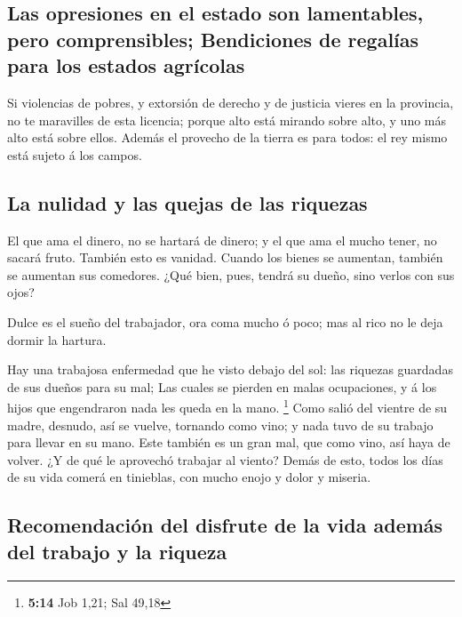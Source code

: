 \hypertarget{las-opresiones-en-el-estado-son-lamentables-pero-comprensibles-bendiciones-de-regaluxedas-para-los-estados-agruxedcolas}{%
\subsection{Las opresiones en el estado son lamentables, pero
comprensibles; Bendiciones de regalías para los estados
agrícolas}\label{las-opresiones-en-el-estado-son-lamentables-pero-comprensibles-bendiciones-de-regaluxedas-para-los-estados-agruxedcolas}}

 Si violencias de pobres, y extorsión de derecho y de
justicia vieres en la provincia, no te maravilles de esta licencia;
porque alto está mirando sobre alto, y uno más alto está sobre ellos.
 Además el provecho de la tierra es para todos: el rey
mismo está sujeto á los campos.

\hypertarget{la-nulidad-y-las-quejas-de-las-riquezas}{%
\subsection{La nulidad y las quejas de las
riquezas}\label{la-nulidad-y-las-quejas-de-las-riquezas}}

 El que ama el dinero, no se hartará de dinero; y el que
ama el mucho tener, no sacará fruto. También esto es vanidad.
 Cuando los bienes se aumentan, también se aumentan sus
comedores. ¿Qué bien, pues, tendrá su dueño, sino verlos con sus ojos?

 Dulce es el sueño del trabajador, ora coma mucho ó poco;
mas al rico no le deja dormir la hartura.

 Hay una trabajosa enfermedad que he visto debajo del
sol: las riquezas guardadas de sus dueños para su mal; 
Las cuales se pierden en malas ocupaciones, y á los hijos que
engendraron nada les queda en la mano. \footnote{\textbf{5:14} Job 1,21;
  Sal 49,18}  Como salió del vientre de su madre,
desnudo, así se vuelve, tornando como vino; y nada tuvo de su trabajo
para llevar en su mano.  Este también es un gran mal, que
como vino, así haya de volver. ¿Y de qué le aprovechó trabajar al
viento?  Demás de esto, todos los días de su vida comerá
en tinieblas, con mucho enojo y dolor y miseria.

\hypertarget{recomendaciuxf3n-del-disfrute-de-la-vida-ademuxe1s-del-trabajo-y-la-riqueza}{%
\subsection{Recomendación del disfrute de la vida además del trabajo y
la
riqueza}\label{recomendaciuxf3n-del-disfrute-de-la-vida-ademuxe1s-del-trabajo-y-la-riqueza}}

